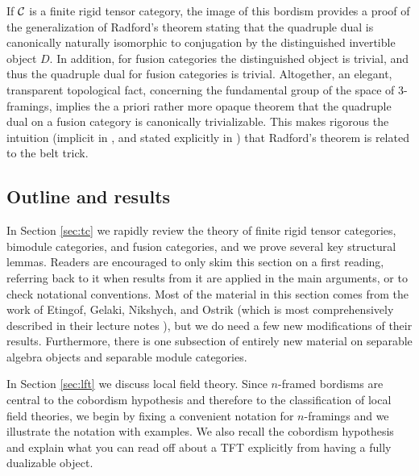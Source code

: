 \documentclass{amsart}
\begin{document}
If $\mathcal C$ is a finite rigid tensor category, the image of this bordism provides a proof of the generalization of Radford's theorem \cite{MR0407069, MR2097289} stating that the quadruple dual is canonically naturally isomorphic to conjugation by the distinguished invertible object $D$.  In addition, for fusion categories the distinguished object is trivial, and thus the quadruple dual for fusion categories is trivial.  Altogether, an elegant, transparent topological fact, concerning the fundamental group of the space of $3$-framings, implies the a priori rather more opaque theorem that the quadruple dual on a fusion category is canonically trivializable. This makes rigorous the intuition (implicit in \cite{MR2559711}, and stated explicitly in \cite{0901.3975}) that Radford's theorem is related to the belt trick.    %


\subsection{Outline and results}

In Section \ref{sec:tc} we rapidly review the theory of finite rigid tensor categories, bimodule categories, and fusion categories, and we prove several key structural lemmas.  Readers are encouraged to only skim this section on a first reading, referring back to it when results from it are applied in the main arguments, or to check notational conventions.  Most of the material in this section comes from the work of Etingof, Gelaki, Nikshych, and Ostrik (which is most comprehensively described in their lecture notes \cite{EGNO}), but we do need a few new modifications of their results.  Furthermore, there is one subsection of entirely new material on separable algebra objects and separable module categories.  

In Section \ref{sec:lft} we discuss local field theory.  Since $n$-framed bordisms are central to the cobordism hypothesis and therefore to the classification of local field theories, we begin by fixing a convenient notation for $n$-framings and we illustrate the notation with examples.  We also recall the cobordism hypothesis and explain what you can read off about a TFT explicitly from having a fully dualizable object.
\end{document}
